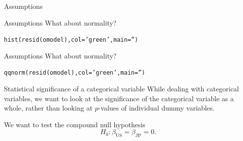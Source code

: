\documentclass{beamer}\usepackage[]{graphicx}\usepackage[]{color}
\makeatletter
\newcommand{\hlstr}[1]{\textcolor[rgb]{1,0.894,0.71}{#1}}%
\newcommand{\hlstd}[1]{\textcolor[rgb]{1,0.894,0.769}{#1}}%
\newcommand{\hlkwc}[1]{\textcolor[rgb]{0.78,0.941,0.545}{#1}}%
\newcommand{\hlkwd}[1]{\textcolor[rgb]{1,0.78,0.769}{#1}}%
\newenvironment{kframe}{%
 \def\at@end@of@kframe{}%
 \ifinner\ifhmode%
  \def\at@end@of@kframe{\end{minipage}}%
  \begin{minipage}{\columnwidth}%
 \fi\fi%
 \def\FrameCommand##1{\hskip\@totalleftmargin \hskip-\fboxsep
 \colorbox{shadecolor}{##1}\hskip-\fboxsep
     \hskip-\linewidth \hskip-\@totalleftmargin \hskip\columnwidth}%
 \MakeFramed {\advance\hsize-\width
   \@totalleftmargin\z@ \linewidth\hsize
   \@setminipage}}%
 {\par\unskip\endMakeFramed%
 \at@end@of@kframe}
\newenvironment{knitrout}{}{} %
\makeatother
\begin{document}
\begin{darkframes}
\begin{frame}[fragile]{Assumptions}
\begin{knitrout}
\end{knitrout}
      
\end{frame}
      
      
      
\begin{frame}[fragile]{Assumptions}
      \fontsize{9}{9}\selectfont
        What about normality?
\begin{knitrout}
\begin{kframe}
\begin{alltt}
  \hlkwd{hist}\hlstd{(}\hlkwd{resid}\hlstd{(omodel),} \hlkwc{col}\hlstd{=}\hlstr{'green'}\hlstd{,} \hlkwc{main}\hlstd{=}\hlstr{''}\hlstd{)}
\end{alltt}
\end{kframe}


\end{knitrout}
      
\end{frame}
      
      
\begin{frame}[fragile]{Assumptions}
        \fontsize{9}{9}\selectfont
        What about normality?
        
\begin{knitrout}
\begin{kframe}
\begin{alltt}
  \hlkwd{qqnorm}\hlstd{(}\hlkwd{resid}\hlstd{(omodel),} \hlkwc{col}\hlstd{=}\hlstr{'green'}\hlstd{,} \hlkwc{main}\hlstd{=}\hlstr{''}\hlstd{)}
\end{alltt}
\end{kframe}


\end{knitrout}
      
\end{frame}

\begin{frame}[fragile]{Statistical significance of a categorical variable}
        While dealing with categorical variables, we want to look at the significance of the categorical variable as a whole, rather than looking at $p$-values of individual dummy variables.

        \bigskip\pause

        We want to test the \alert{compound null hypothesis} 
        \[
          H_0 : \beta_{\text{US}} = \beta_{\text{JP}} = 0.
        \]
\end{frame}
      

\end{darkframes}
\end{document}
